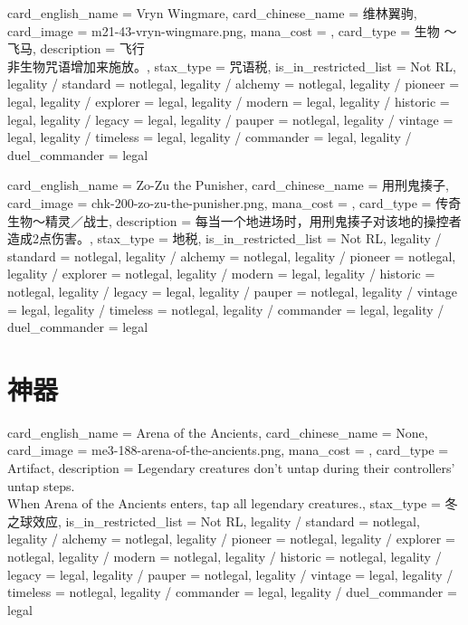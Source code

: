 \documentclass[lang = cn, color = black, 10pt]{AllThatStax}
\begin{document}
\card
{
	card_english_name = {Vryn Wingmare},
	card_chinese_name = {维林翼驹},
	card_image = m21-43-vryn-wingmare.png,
	mana_cost = ,
	card_type = 生物 ～飞马,
	description = {飞行\\
		非生物咒语增加来施放。},
	stax_type = 咒语税,
	is_in_restricted_list = Not RL,
	legality / standard = notlegal,
	legality / alchemy = notlegal,
	legality / pioneer = legal,
	legality / explorer = legal,
	legality / modern = legal,
	legality / historic = legal,
	legality / legacy = legal,
	legality / pauper = notlegal,
	legality / vintage = legal,
	legality / timeless = legal,
	legality / commander = legal,
	legality / duel_commander = legal
}

\card
{
	card_english_name = {Zo-Zu the Punisher},
	card_chinese_name = {用刑鬼揍子},
	card_image = chk-200-zo-zu-the-punisher.png,
	mana_cost = ,
	card_type = 传奇生物～精灵／战士,
	description = {每当一个地进场时，用刑鬼揍子对该地的操控者造成2点伤害。},
	stax_type = 地税,
	is_in_restricted_list = Not RL,
	legality / standard = notlegal,
	legality / alchemy = notlegal,
	legality / pioneer = notlegal,
	legality / explorer = notlegal,
	legality / modern = legal,
	legality / historic = notlegal,
	legality / legacy = legal,
	legality / pauper = notlegal,
	legality / vintage = legal,
	legality / timeless = notlegal,
	legality / commander = legal,
	legality / duel_commander = legal
}

\section{神器}

\card
{
	card_english_name = {Arena of the Ancients},
	card_chinese_name = {None},
	card_image = me3-188-arena-of-the-ancients.png,
	mana_cost = ,
	card_type = Artifact,
	description = {Legendary creatures don't untap during their controllers' untap steps.\\
		When Arena of the Ancients enters, tap all legendary creatures.},
	stax_type = 冬之球效应,
	is_in_restricted_list = Not RL,
	legality / standard = notlegal,
	legality / alchemy = notlegal,
	legality / pioneer = notlegal,
	legality / explorer = notlegal,
	legality / modern = notlegal,
	legality / historic = notlegal,
	legality / legacy = legal,
	legality / pauper = notlegal,
	legality / vintage = legal,
	legality / timeless = notlegal,
	legality / commander = legal,
	legality / duel_commander = legal
}
\end{document}
